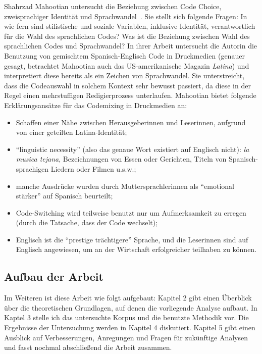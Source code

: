 Shahrzad Mahootian untersucht die Beziehung zwischen Code Choice, zweisprachiger Identität und Sprachwandel~\cite[]{Mahootian05}.
Sie stellt sich folgende Fragen: In wie fern sind stilistische und soziale Variablen, inklusive Identität, verantwortlich für die Wahl des sprachlichen Codes?
Was ist die Beziehung zwischen Wahl des sprachlichen Codes und Sprachwandel?
In ihrer Arbeit untersucht die Autorin die Benutzung von gemischtem Spanisch-Englisch Code in Druckmedien (genauer gesagt, betrachtet Mahootian auch das US-amerikanische Magazin \textit{Latina}) und interpretiert diese bereits als ein Zeichen von Sprachwandel.
Sie unterstreicht, dass die Codeauswahl in solchem Kontext sehr bewusst passiert, da diese in der Regel einen mehrstuffigen Redigierprozess unterlaufen.
Mahootian bietet folgende Erklärungsansätze für das Codemixing in Druckmedien an:
\begin{itemize}
  \item Schaffen einer Nähe zwischen Herausgeberinnen und Leserinnen, aufgrund von einer geteilten Latina-Identität;
  \item ``linguistic necessity'' (also das genaue Wort existiert auf Englisch nicht): \textit{la musica tejana}, Bezeichnungen von Essen oder Gerichten, Titeln von Spanisch-sprachigen Liedern oder Filmen u.s.w.;
  \item manche Ausdrücke wurden durch Muttersprachlerinnen als ``emotional stärker'' auf Spanisch beurteilt;
  \item Code-Switching wird teilweise benutzt nur um Aufmerksamkeit zu erregen (durch die Tatsache, dass der Code wechselt);
  \item Englisch ist die ``prestige trächtigere'' Sprache, und die Leserinnen sind auf Englisch angewiesen, um an der Wirtschaft erfolgreicher teilhaben zu können.
\end{itemize}


\subsection{Aufbau der Arbeit}

Im Weiteren ist diese Arbeit wie folgt aufgebaut:
Kapitel 2 gibt einen Überblick über die theoretischen Grundlagen, auf denen die vorliegende Analyse aufbaut.
In Kaptel 3 stelle ich das untersuchte Korpus und die benutzte Methodik vor.
Die Ergebnisse der Untersuchung werden in Kapitel 4 diskutiert.
Kapitel 5 gibt einen Ausblick auf Verbesserungen, Anregungen und Fragen für zukünftige Analysen und fasst nochmal abschließend die Arbeit zusammen.

